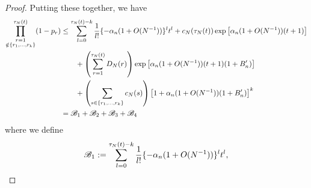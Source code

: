 \documentclass{article}
\newcommand{\1}[1]{\mathbbm{1}_{#1}}
\begin{document}
\begin{proof}
Putting these together, we have
\begin{align}
\prod_{\substack{r=1 \\ \notin \{r_1,\dots,r_k\} }}^{\tau_N(t)} (1-p_r)
&\leq \sum_{l=0}^{\tau_N(t) -k} \frac{1}{l!} \{ - \alpha_n (1+O(N^{-1})) \}^l t^l
+ c_N(\tau_N(t)) \exp\left[ \alpha_n (1+O(N^{-1})) (t+1) \right] \notag\\
&\qquad+ \left( \sum_{r=1}^{\tau_N(t)} D_N(r) \right) \exp\left[ \alpha_n (1+O(N^{-1})) (t+1) (1+B_n^\prime) \right] \notag\\
&\qquad+ \left( \sum_{s\in \{r_1,\dots,r_k\} } c_N(s) \right)
\left[ 1 + \alpha_n (1+O(N^{-1})) (1 + B_n^\prime) \right]^k \notag\\
&= \mathscr{B}_1 + \mathscr{B}_2 + \mathscr{B}_3 + \mathscr{B}_4
\end{align}
where we define
\begin{align}
\mathscr{B}_1 &:= \sum_{l=0}^{\tau_N(t) -k} \frac{1}{l!} \{ - \alpha_n (1+O(N^{-1})) \}^l t^l , \notag\\

\end{align}
\end{proof}
\end{document}
